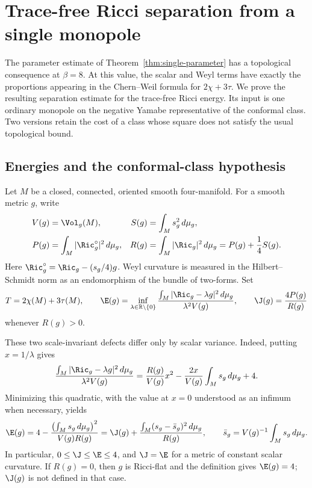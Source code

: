 \section{Trace-free Ricci separation from a single monopole}
\label{sec:tracefree-gap}

The parameter estimate of Theorem~\ref{thm:single-parameter} has a
topological consequence at $\beta=8$.  At this value, the scalar and Weyl
terms have exactly the proportions appearing in the Chern--Weil formula
for $2\chi+3\tau$.  We prove the resulting separation estimate for the
trace-free Ricci energy.  Its input is one ordinary monopole on the
negative Yamabe representative of the conformal class.  Two versions
retain the cost of a class whose square does not satisfy the usual
topological bound.

\subsection{Energies and the conformal-class hypothesis}

Let $M$ be a closed, connected, oriented smooth four-manifold.  For a
smooth metric $g$, write
\begin{align}
 V(g)&=\Vol_g(M),&
 S(g)&=\int_M s_g^2\,d\mu_g,\notag\\
 P(g)&=\int_M|\Ric_g^\circ|^2\,d\mu_g,&
 R(g)&=\int_M|\Ric_g|^2\,d\mu_g=P(g)+\frac14S(g).
 \label{eq:trf-energies}
\end{align}
Here $\Ric_g^\circ=\Ric_g-(s_g/4)g$.  Weyl curvature is measured in the
Hilbert--Schmidt norm as an endomorphism of the bundle of two-forms.  Set
\begin{equation}
 T=2\chi(M)+3\tau(M),\qquad
 \E(g)=\inf_{\lambda\in\mathbb R\setminus\{0\}}
 \frac{\int_M|\Ric_g-\lambda g|^2\,d\mu_g}{\lambda^2V(g)},
 \qquad \J(g)=\frac{4P(g)}{R(g)}
 \label{eq:trf-defects}
\end{equation}
whenever $R(g)>0$.

These two scale-invariant defects differ only by scalar variance.  Indeed,
putting $x=1/\lambda$ gives
\[
 \frac{\int_M|\Ric_g-\lambda g|^2\,d\mu_g}{\lambda^2V(g)}
 =\frac{R(g)}{V(g)}x^2
   -\frac{2x}{V(g)}\int_Ms_g\,d\mu_g+4.
\]
Minimizing this quadratic, with the value at $x=0$ understood as an
infimum when necessary, yields
\begin{equation}
 \E(g)=4-\frac{\left(\int_Ms_g\,d\mu_g\right)^2}{V(g)R(g)}
 =\J(g)+\frac{\int_M(s_g-\bar s_g)^2\,d\mu_g}{R(g)},
 \qquad
 \bar s_g=V(g)^{-1}\int_Ms_g\,d\mu_g.
 \label{eq:trf-variance}
\end{equation}
In particular, $0\le\J\le\E\le4$, and $\J=\E$ for a metric of
constant scalar curvature.  If $R(g)=0$, then $g$ is Ricci-flat and the
definition gives $\E(g)=4$; $\J(g)$ is not defined in that case.


